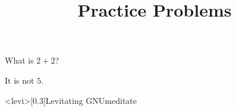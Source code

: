 \documentclass{homework}
\title{Practice Problems}
\begin{document}
 \maketitle

\question What is $2+2$?

It is not $5$.

\img<levi>[0.3]{Levitating GNU}{meditate}
\end{document}
